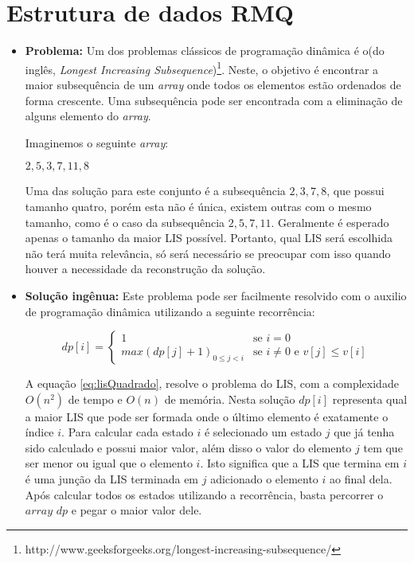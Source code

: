 \section{Estrutura de dados RMQ}

\begin{itemize}
 \item \textbf{Problema:} Um dos problemas clássicos de programação dinâmica é o(do inglês, \textit{Longest Increasing Subsequence})\footnote{http://www.geeksforgeeks.org/longest-increasing-subsequence/}. Neste, o objetivo é encontrar a maior subsequência de um \textit{array} onde todos os elementos estão ordenados de forma crescente. Uma subsequência pode ser encontrada com a eliminação de alguns elemento do \textit{array}.

Imaginemos o seguinte \textit{array}:

\begin{center}
	${2, 5, 3, 7, 11, 8}$
\end{center}

Uma das solução para este conjunto é a subsequência ${2, 3, 7, 8}$, que possui tamanho quatro, porém esta não é única, existem outras com o mesmo tamanho, como é o caso da subsequência ${2, 5, 7, 11}$. Geralmente é esperado apenas o tamanho da maior LIS possível. Portanto, qual LIS será escolhida não terá muita relevância, só será necessário se preocupar com isso quando houver a necessidade da reconstrução da solução.

\item \textbf{Solução ingênua:} Este problema pode ser facilmente resolvido com o auxilio de programação dinâmica utilizando a seguinte recorrência:

\begin{equation}
dp[i] = 
\begin{cases}
1 &\text{se } i = 0 \\
max(dp[j] + 1)_{0 \leq j < i} &\text{se } i \neq 0 \text{ e } v[j] \leq v[i]

\end{cases}
\label{eq:lisQuadrado}
\end{equation}

A equação \ref{eq:lisQuadrado}, resolve o problema do LIS, com a complexidade $O(n^2)$ de tempo e $O(n)$ de memória. Nesta solução $dp[i]$ representa qual a maior LIS que pode ser formada onde o último elemento é exatamente o índice $i$. Para calcular cada estado $i$ é selecionado um estado $j$ que já tenha sido calculado e possui maior valor, além disso o valor do elemento $j$ tem que ser menor ou igual que o elemento $i$. Isto significa que a LIS que termina em $i$ é uma junção da LIS terminada em $j$ adicionado o elemento $i$ ao final dela. Após calcular todos os estados utilizando a recorrência, basta percorrer o $array$ $dp$ e pegar o maior valor dele.


\end{itemize}
